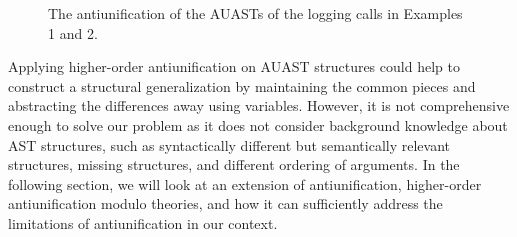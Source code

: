 \begin{figure}[p]
\begin{small}
\end{small}
\caption{The antiunification of the AUASTs of the logging calls in Examples 1 and 2.\label{fig:logging-anti}}
\end{figure}

Applying higher-order antiunification on AUAST structures could help to construct a structural generalization by maintaining the common pieces and abstracting the differences away using variables. However, it is not comprehensive enough to solve our problem as it does not consider background knowledge about AST structures, such as syntactically different but semantically relevant structures, missing structures, and different ordering of arguments. In the following section, we will look at an extension of antiunification, higher-order antiunification modulo theories, and how it can sufficiently address the limitations of antiunification in our context.


